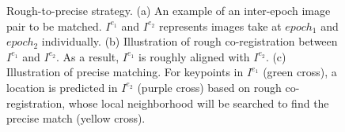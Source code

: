 \begin{figure}[htbp]
	\begin{center}
		\caption{ Rough-to-precise strategy. (a) An example of an inter-epoch image pair to be matched. $I^{e_1}$ and $I^{e_2}$ represents images take at $epoch_1$ and $epoch_2$ individually. (b) Illustration of rough co-registration between $I^{e_1}$ and $I^{e_2}$. As a result, $I^{e_1}$ is roughly aligned with $I^{e_2}$. (c) Illustration of precise matching. For keypoints in $I^{e_1}$ (green cross), a location is predicted in $I^{e_2}$ (purple cross) based on rough co-registration, whose local neighborhood will be searched to find the precise match (yellow cross).}
		\label{rough-to-precise}
	\end{center}
\end{figure}

